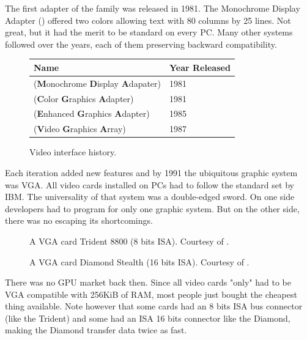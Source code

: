 \documentclass[book.tex]{subfiles}
\begin{document}
The first adapter of the family was released in 1981. The Monochrome Display
   Adapter () offered two colors allowing text with 80 columns by 25 lines.  Not great, but it had the merit to be standard on every PC. Many other systems followed over the years, each of them preserving backward compatibility.
\bigskip
  
 \begin{figure}[H]
\centering  
\begin{tabularx}{\textwidth}{ X  Y }
  \toprule
  \textbf{Name} &  \textbf{Year Released} \\
  \toprule {}
   (\textbf{M}onochrome
   \textbf{D}isplay
   \textbf{A}dapater) & 1981 
   \\ 
   (\textbf{C}olor
   \textbf{G}raphics
   \textbf{A}dapter) & 1981 
    \\ 
   (\textbf{E}nhanced
   \textbf{G}raphics
   \textbf{A}dapter) & 1985
   \\ 
   (\textbf{V}ideo
   \textbf{G}raphics
   \textbf{A}rray)  & 1987
    \\
  \toprule
\end{tabularx}
\caption{Video interface history.}\label{fig:vga_history}
\end{figure}

Each iteration added new features and by 1991 the ubiquitous graphic system was VGA. All video cards installed on PCs had to follow the standard set by IBM. The universality of that system was a double-edged sword. On one side developers had to program for only one graphic system. But on the other side, there was no escaping its shortcomings.\\

\begin{figure}[H] 
  \centering 
  \caption{A VGA card Trident 8800 (8 bits ISA). Courtesy of .}
\end{figure}
\par
\begin{figure}[H] 
  \centering 
  \caption{A VGA card Diamond Stealth (16 bits ISA). Courtesy of .}
\end{figure}
 There was no GPU market back then. Since all video cards "only" had to be VGA compatible with 256KiB of RAM, most people just bought the cheapest thing available. Note however that some cards had an 8 bits ISA bus connector (like the Trident) and some had an ISA 16 bits connector like the Diamond, making the Diamond transfer data twice as fast.\\
\par
\end{document}
